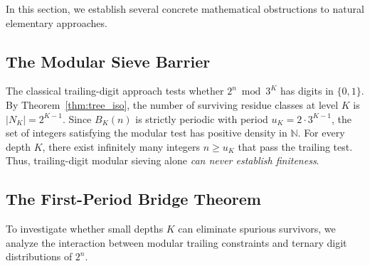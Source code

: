 \documentclass[11pt,reqno]{amsart}
\theoremstyle{plain}
\theoremstyle{definition}
\theoremstyle{remark}
\newcommand{\N}{\mathbb{N}}
\begin{document}
In this section, we establish several concrete mathematical obstructions to natural elementary approaches.

\subsection{The Modular Sieve Barrier}
The classical trailing-digit approach tests whether $2^n \bmod 3^K$ has digits in $\{0, 1\}$. By Theorem~\ref{thm:tree_iso}, the number of surviving residue classes at level $K$ is $|N_K| = 2^{K-1}$. Since $B_K(n)$ is strictly periodic with period $u_K = 2 \cdot 3^{K-1}$, the set of integers satisfying the modular test has positive density in $\N$. For every depth $K$, there exist infinitely many integers $n \ge u_K$ that pass the trailing test. Thus, trailing-digit modular sieving alone \emph{can never establish finiteness}.

\subsection{The First-Period Bridge Theorem}\label{subsec:bridge}
To investigate whether small depths $K$ can eliminate spurious survivors, we analyze the interaction between modular trailing constraints and ternary digit distributions of $2^n$.
\end{document}

